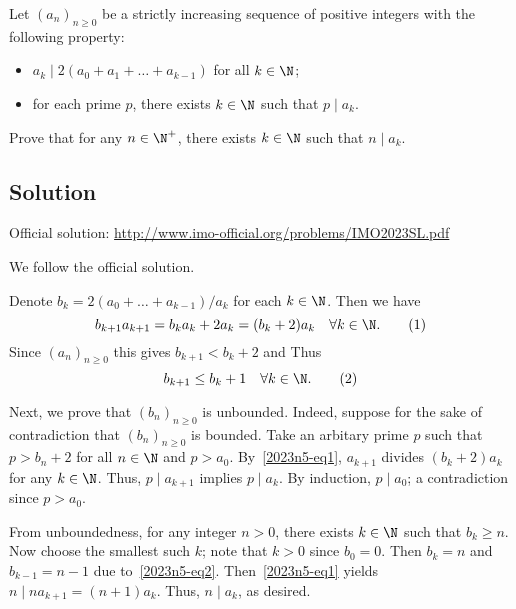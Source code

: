 Let $(a_n)_{n \geq 0}$ be a strictly increasing sequence of positive integers with the following property:
\begin{itemize}
    \item   $a_k \mid 2(a_0 + a_1 + \ldots + a_{k - 1})$ for all $k \in \N$;
    \item   for each prime $p$, there exists $k \in \N$ such that $p \mid a_k$.
\end{itemize}

Prove that for any $n \in \N^+$, there exists $k \in \N$ such that $n \mid a_k$.



\subsection*{Solution}

Official solution: \url{http://www.imo-official.org/problems/IMO2023SL.pdf}

We follow the official solution.

Denote $b_k = 2(a_0 + \ldots + a_{k - 1})/a_k$ for each $k \in \N$.
Then we have
\[ b_{k + 1} a_{k + 1} = b_k a_k + 2 a_k = (b_k + 2) a_k \quad \forall k \in \N. \tag{1}\label{2023n5-eq1} \]
Since $(a_n)_{n \geq 0}$ this gives $b_{k + 1} < b_k + 2$ and Thus
\[ b_{k + 1} \leq b_k + 1 \quad \forall k \in \N. \tag{2}\label{2023n5-eq2} \]

Next, we prove that $(b_n)_{n \geq 0}$ is unbounded.
Indeed, suppose for the sake of contradiction that $(b_n)_{n \geq 0}$ is bounded.
Take an arbitary prime $p$ such that $p > b_n + 2$ for all $n \in \N$ and $p > a_0$.
By~\eqref{2023n5-eq1}, $a_{k + 1}$ divides $(b_k + 2) a_k$ for any $k \in \N$.
Thus, $p \mid a_{k + 1}$ implies $p \mid a_k$.
By induction, $p \mid a_0$; a contradiction since $p > a_0$.

From unboundedness, for any integer $n > 0$, there exists $k \in \N$ such that $b_k \geq n$.
Now choose the smallest such $k$; note that $k > 0$ since $b_0 = 0$.
Then $b_k = n$ and $b_{k - 1} = n - 1$ due to~\eqref{2023n5-eq2}.
Then~\eqref{2023n5-eq1} yields $n \mid n a_{k + 1} = (n + 1) a_k$.
Thus, $n \mid a_k$, as desired.

